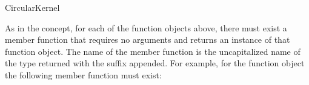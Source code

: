 \begin{ccRefConcept}{CircularKernel}
\ccOperations

As in the  concept, for each of the function objects
above, there must exist a member function that requires no arguments
and returns an instance of that function object. The name of the
member function is the uncapitalized name of the type returned with
the suffix  appended. For example, for the function object 
 the following member function 
must exist: 


\ccSeeAlso


\end{ccRefConcept}
